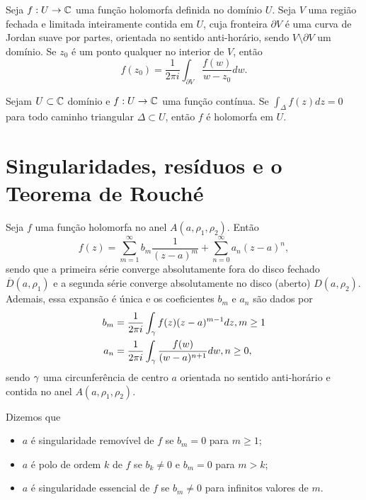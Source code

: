 \begin{teorema}
Seja $f:U\to\mathbb{C}$ uma função holomorfa definida no domínio $U$. Seja $V$ uma região fechada e limitada inteiramente contida em $U$, 
cuja fronteira $\partial V$ é uma curva de Jordan suave por partes, orientada no sentido anti-horário, sendo $V\setminus\partial V$ um domínio.
Se $z_0$ é um ponto qualquer no interior de $V$, então
\begin{equation*}
    f(z_0) = \frac{1}{2\pi i}\int_{\partial V} \frac{f(w)}{w-z_0} dw.
\end{equation*}
\end{teorema}


\begin{teorema}
\label{teo-morera}
Sejam $U\subset\mathbb{C}$ domínio e $f:U\to\mathbb{C}$ uma função contínua.
Se $\int_{\Delta} f(z) dz = 0$ para todo caminho triangular $\Delta\subset U$, então $f$ é holomorfa em $U$.
\end{teorema}


\section[Singularidades, resíduos e o Teorema de Rouché]{Singularidades, resíduos e o Teorema de Rouché}

\begin{teorema}
\label{teo-laurent}
Seja $f$ uma função holomorfa no anel $A(a, \rho_1, \rho_2)$. Então
\begin{equation*}
    f(z) = \sum_{m=1}^{\infty} b_m\frac{1}{(z-a)^m} + \sum_{n=0}^{\infty} a_n(z-a)^n,
\end{equation*}
sendo que a primeira série converge absolutamente fora do disco fechado $\overline{D}(a, \rho_1)$
e a segunda série converge absolutamente no disco (aberto) $D(a, \rho_2)$. 
Ademais, essa expansão é única e os coeficientes $b_m$ e $a_n$ são dados por
\begin{align*}
    b_m &= \frac{1}{2\pi i}\int_{\gamma} f(z)(z-a)^{m-1} dz, m\geq 1 \\
    a_n &= \frac{1}{2\pi i}\int_{\gamma} \frac{f(w)}{(w-a)^{n+1}} dw, n\geq 0,
\end{align*}
sendo $\gamma$ uma circunferência de centro $a$ orientada no sentido anti-horário 
e contida no anel $A(a, \rho_1, \rho_2)$.
\end{teorema}


\begin{definicao}
Dizemos que 
\begin{itemize}
    \item $a$ é singularidade removível de $f$ se $b_m = 0$ para $m\geq 1$;
    \item $a$ é polo de ordem $k$ de $f$ se $b_k\neq 0$ e $b_m = 0$ para $m>k$;
    \item $a$ é singularidade essencial de $f$ se $b_m\neq 0$ para infinitos valores de $m$.
\end{itemize}
\end{definicao}



